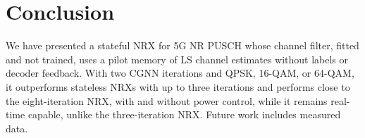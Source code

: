 \section{Conclusion}
We have presented a stateful NRX for 5G NR PUSCH whose channel filter, fitted and not trained, uses a pilot memory of LS channel estimates without labels or decoder feedback. With two CGNN iterations and QPSK, 16-QAM, or 64-QAM, it outperforms stateless NRXs with up to three iterations and performs close to the eight-iteration NRX, with and without power control, while it remains real-time capable, unlike the three-iteration NRX. Future work includes measured data.